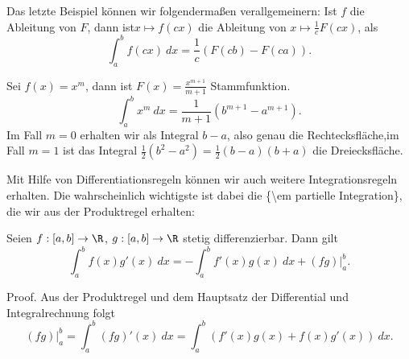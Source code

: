 \documentclass[letterpaper,10pt,english]{jupyterBook}
\begin{document}
Das letzte Beispiel können wir folgendermaßen verallgemeinern: Ist \(f\) die Ableitung von \(F\), dann ist\(x \mapsto f(c x)\) die Ableitung von \(x\mapsto \frac{1}c F(cx)\), als
\begin{equation*}
 \int_a^b f(cx)~dx = \frac{1}c (F(cb) - F(ca)).
\end{equation*}\label{integration/hdi:example-5}
\begin{example}{}{}



Sei \(f(x) = x^m\), dann ist \(F(x) = \frac{x^{m+1}}{m+1}\) Stammfunktion.
\begin{equation*}
 \int_a^b x^m ~dx =\frac{1}{m+1}  (b^{m+1} -a^{m+1}).
\end{equation*}
Im Fall \(m=0\) erhalten wir als Integral \(b-a\), also genau die Rechtecksfläche,im Fall \(m=1\) ist das Integral \(\frac{1}2 (b^2-a^2) = \frac{1}2 (b-a)(b+a)\) die Dreiecksfläche.
\end{example}

Mit Hilfe von Differentiationsregeln können wir auch weitere Integrationsregeln erhalten. Die wahrscheinlich
wichtigste ist dabei die \{\textbackslash{}em partielle Integration\}, die wir aus der Produktregel erhalten:
\label{integration/hdi:theorem-6}
\begin{theorem}{}{}



Seien \(f:[a,b] \rightarrow \R\), \(g:[a,b] \rightarrow \R\) stetig differenzierbar. Dann gilt
\begin{equation*}
 \int_a^b f(x) g'(x) ~dx = - \int_a^b f'(x) g(x)~dx + (fg)\vert_a^b.
\end{equation*}\end{theorem}

\begin{emphBox}{}{}
Proof. Aus der Produktregel und dem Hauptsatz der Differential  und Integralrechnung folgt
\begin{equation*}
 (fg)\vert_a^b = \int_a^b (fg)'(x)~dx = \int_a^b (f'(x)g(x) + f(x)g'(x))~dx.
\end{equation*}\end{emphBox}
\end{document}
